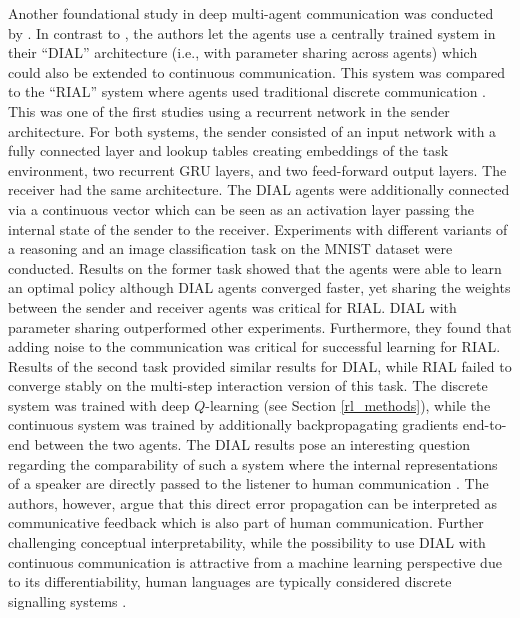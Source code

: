 Another foundational study in deep multi-agent communication was conducted by \cite{foerster2016learning}. In contrast to \cite{lazaridou2016multi}, the authors let the agents use a centrally trained system in their ``DIAL'' architecture (i.e., with parameter sharing across agents)  which could also be extended to continuous communication. This system was compared to the ``RIAL'' system where agents used traditional discrete communication \parencite[][p. 2]{foerster2016learning}. This was one of the first studies using a recurrent network in the sender architecture.
For both systems, the sender consisted of an input network with a fully connected layer and lookup tables creating embeddings of the task environment, two recurrent GRU layers, and two feed-forward output layers.
The receiver had the same architecture. The DIAL agents were additionally connected via a continuous vector which can be seen as an activation layer passing the internal state of the sender to the receiver.
Experiments with different variants of a reasoning and an image classification task on the MNIST dataset were conducted. Results on the former task showed that the agents were able to learn an optimal policy although DIAL agents converged faster, yet sharing the weights between the sender and receiver agents was critical for RIAL. DIAL with parameter sharing outperformed other experiments. Furthermore, they found that adding noise to the communication was critical for successful learning for RIAL. Results of the second task provided similar results for DIAL, while RIAL failed to converge stably on the multi-step interaction version of this task. 
The discrete system was trained with deep $Q$-learning (see Section \ref{rl_methods}), while the continuous system was trained by additionally backpropagating gradients end-to-end between the two agents. %
The DIAL results pose an interesting question regarding the comparability of such a system where the internal representations of a speaker are directly passed to the listener to human communication \parencite[cf.][]{lazaridou2020emergent, hockett1960origin}. The authors, however, argue that this direct error propagation can be interpreted as communicative feedback which is also part of human communication. Further challenging conceptual interpretability, while the possibility to use DIAL with continuous communication is attractive from a machine learning perspective due to its differentiability, human languages are typically considered discrete signalling systems \parencite{hockett1960origin}. 

